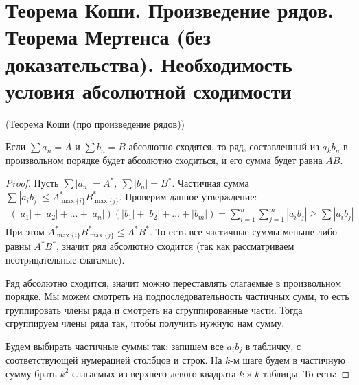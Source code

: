 \section{Теорема Коши. Произведение рядов. Теорема Мертенса (без доказательства). Необходимость условия абсолютной сходимости}
\begin{theorem}
    (Теорема Коши (про произведение рядов)) 
    
    Если $\sum a_n = A$ и $\sum b_n = B$ абсолютно сходятся, то
    ряд, составленный из $a_kb_n$ в произвольном порядке будет абсолютно сходиться, и его сумма будет равна $AB$.
\end{theorem}
\begin{proof}
    Пусть $\sum |a_n| = A^*,\ \sum|b_n| = B^*$. Частичная сумма $\sum |a_i b_j| \leq A^*_{\max\{i\}}B^*_{\max\{j\}}$. Проверим данное утверждение:
    \begin{gather*}
        (|a_1| + |a_2| + \ldots + |a_n|)(|b_1| + |b_2|+\ldots + |b_m|) = \sum \limits_{i=1}^n \sum \limits_{j=1}^m |a_i b_j| \geq \sum|a_i b_j|
    \end{gather*}
    При этом $A^*_{\max\{i\}} B^*_{\max\{j\}} \leqslant A^* B^*$. То есть все частичные суммы 
    меньше либо равны $A^*B^*$, значит ряд абсолютно сходится (так как рассматриваем неотрицательные слагамые).

    Ряд абсолютно сходится, значит можно переставлять слагаемые в произвольном порядке.
    Мы можем смотреть на подпоследовательность частичных сумм, то есть группировать
    члены ряда и смотреть на сгруппированные части. Тогда сгруппируем члены ряда так, 
    чтобы получить нужную нам сумму.

    Будем выбирать частичные суммы так: запишем все $a_ib_j$ в табличку,
    с соответствующей нумерацией столбцов и строк. На $k$-м шаге
    будем в частичную сумму брать $k^2$ слагаемых из верхнего
    левого квадрата $k\times k$ таблицы. То есть:
      

\end{proof}
